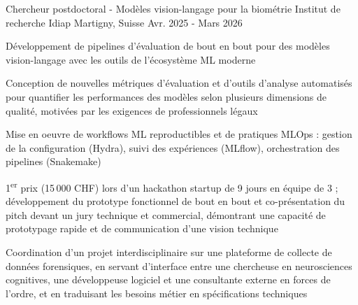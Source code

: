 

\begin{cventries}

\cventry
    {Chercheur postdoctoral - Modèles vision-langage pour la biométrie} %
    {Institut de recherche Idiap} %
    {Martigny, Suisse} %
    {Avr. 2025 - Mars 2026} %
    {
      \begin{cvitems} %
        \item {Développement de pipelines d'évaluation de bout en bout pour des modèles vision-langage avec les outils de l'écosystème ML moderne}
        \item {Conception de nouvelles métriques d'évaluation et d'outils d'analyse automatisés pour quantifier les performances des modèles selon plusieurs dimensions de qualité, motivées par les exigences de professionnels légaux}
        \item {Mise en oeuvre de workflows ML reproductibles et de pratiques MLOps : gestion de la configuration (Hydra), suivi des expériences (MLflow), orchestration des pipelines (Snakemake)}
        \item {1\textsuperscript{er} prix (15\,000 CHF) lors d'un hackathon startup de 9 jours en équipe de 3 ; développement du prototype fonctionnel de bout en bout et co-présentation du pitch devant un jury technique et commercial, démontrant une capacité de prototypage rapide et de communication d'une vision technique}
        \item {Coordination d'un projet interdisciplinaire sur une plateforme de collecte de données forensiques, en servant d'interface entre une chercheuse en neurosciences cognitives, une développeuse logiciel et une consultante externe en forces de l'ordre, et en traduisant les besoins métier en spécifications techniques}
      \end{cvitems}
    }


\end{cventries}

